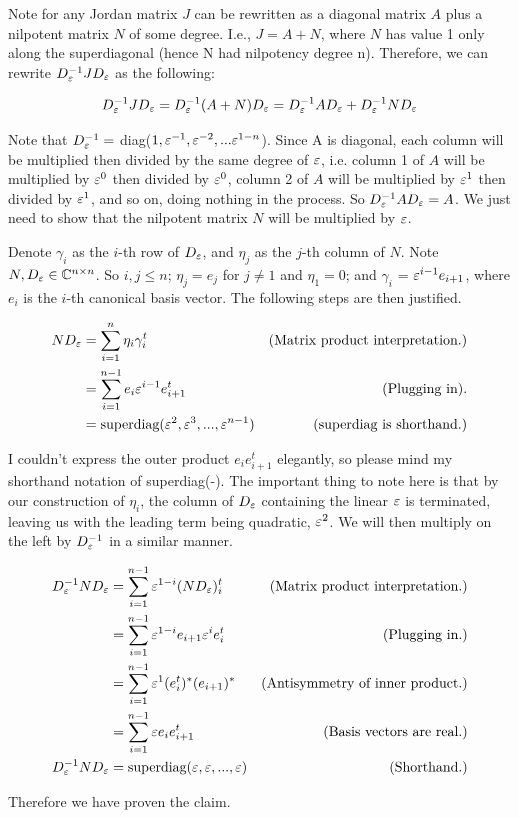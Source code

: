 \begin{solution}
Note for any Jordan matrix $J$ can be rewritten as a diagonal matrix $A$ plus a nilpotent matrix $N$ of some degree. I.e., $J = A + N$, where $N$ has value 1 only along the superdiagonal (hence N had nilpotency degree n). Therefore, we can rewrite $D^{-1}_\varepsilon J D_\varepsilon$ as the following:

\jump
\[
D^{-1}_\varepsilon J D_\varepsilon = D^{-1}_\varepsilon (A + N) D_\varepsilon = D^{-1}_\varepsilon A D_\varepsilon + D^{-1}_\varepsilon N D_\varepsilon
\]
\jump

Note that $D_\varepsilon^{-1} = $ diag($ 1, \varepsilon^{-1}, \varepsilon^{-2}, ... \varepsilon^{1 - n}$). Since A is diagonal, each column will be multiplied then divided by the same degree of $\varepsilon$, i.e. column 1 of $A$ will be multiplied by $\varepsilon^0$ then divided by $\varepsilon^0$, column 2 of $A$ will be multiplied by $\varepsilon^1$ then divided by $\varepsilon^1$, and so on, doing nothing in the process. So $D^{-1}_\varepsilon A D_\varepsilon = A$. We just need to show that the nilpotent matrix $N$ will be multiplied by $\varepsilon$.

\jump
Denote $\gamma_i$ as the $i$-th row of $D_\varepsilon$, and $\eta_j$ as the $j$-th column of $N$. Note $N, D_\varepsilon \in \mathbb{C}^{n\times n}$. So $i,j \leq n$; $\eta_j = e_{j}$ for $j \neq 1$ and $\eta_1 = 0$; and $\gamma_i$ = $\varepsilon^{i -1}e_{i+1}$, where $e_i$ is the $i$-th canonical basis vector. The following steps are then justified.

\alignbreak
\begin{align}
    ND_\varepsilon &= \sum_{i = 1}^n \eta_i\gamma_i^t &\text{(Matrix product interpretation.)}\nonumber\\
    &= \sum_{i = 1}^{n-1} e_{i}\varepsilon^{i - 1}e_{i+1}^t &\text{(Plugging in).}\nonumber\\
    &= \text{superdiag}(\varepsilon^2, \varepsilon^3, ..., \varepsilon^{n - 1}) &\text{(superdiag is shorthand.)}\nonumber
\end{align}
\alignbreak

I couldn't express the outer product $e_{i}e_{i+1}^t$ elegantly, so please mind my shorthand notation of superdiag(-). The important thing to note here is that by our construction of $\eta_i$, the column of $D_\varepsilon$ containing the linear $\varepsilon$ is terminated, leaving us with the leading term being quadratic, $\varepsilon^2$. We will then multiply on the left by $D_\varepsilon^{-1}$ in a similar manner.

\newpage
\alignbreak
\begin{align}
    D^{-1}_\varepsilon ND_\varepsilon &= \sum_{i = 1}^{n-1} \varepsilon^{1-i}(ND_\varepsilon)_i^t &\text{(Matrix product interpretation.)}\nonumber\\   
    &= \sum_{i = 1}^{n-1} \varepsilon^{1-i}e_{i+1}\varepsilon^ie_{i}^t &\text{(Plugging in.)}\nonumber\\
    &= \sum_{i = 1}^{n-1} \varepsilon^{1}(e_{i}^t)^*(e_{i+1})^* &\text{(Antisymmetry of inner product.)}\nonumber\\
    &= \sum_{i = 1}^{n-1} \varepsilon e_{i}e_{i+1}^t &\text{(Basis vectors are real.)}\nonumber\\
    D^{-1}_\varepsilon ND_\varepsilon &= \text{superdiag}(\varepsilon, \varepsilon, ..., \varepsilon) &\text{(Shorthand.)}\nonumber
\end{align}
\alignbreak

Therefore we have proven the claim. 
\end{solution}

